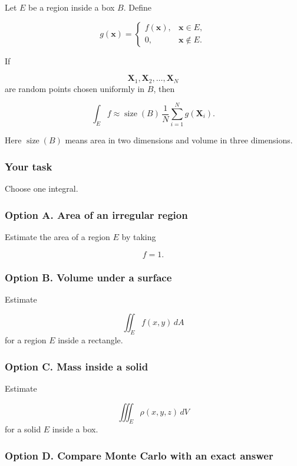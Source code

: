 Let \(E\) be a region inside a box \(B\).  Define

\[
    g(\mathbf x)=
    \begin{cases}
    f(\mathbf x), & \mathbf x\in E,\\
    0, & \mathbf x\notin E.
    \end{cases}
\]

If

\[
    \mathbf X_1,\mathbf X_2,\ldots,\mathbf X_N
\]
are random points chosen uniformly in \(B\), then

\[
\boxed{
    \int_E f
    \approx
    \operatorname{size}(B)\,
    \frac{1}{N}
    \sum_{i=1}^{N} g(\mathbf X_i).
}
\]

Here \(\operatorname{size}(B)\) means area in two dimensions and volume in three
dimensions.

\subsubsection*{Your task}

Choose one integral.

\subsubsection*{Option A. Area of an irregular region}

Estimate the area of a region \(E\) by taking

\[
    f=1.
\]

\subsubsection*{Option B. Volume under a surface}

Estimate

\[
    \iint_E f(x,y)\,dA
\]
for a region \(E\) inside a rectangle.

\subsubsection*{Option C. Mass inside a solid}

Estimate

\[
    \iiint_E \rho(x,y,z)\,dV
\]
for a solid \(E\) inside a box.

\subsubsection*{Option D. Compare Monte Carlo with an exact answer}

